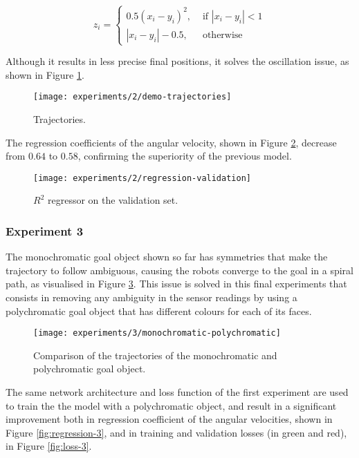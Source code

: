 \begin{equation}
z_i = 
\begin{cases}
0.5 (x_i-y_i)^2, &\text{ if } |x_i-y_i|<1 \\
|x_i-y_i| - 0.5, &\text{ otherwise}
\end{cases}
\end{equation}

 
Although it results in less precise final positions, it solves the oscillation 
issue, as shown in Figure \ref{fig:demo-trajectories}.

\begin{figure}[htbp]
	\centerline{\texttt{[image: experiments/2/demo-trajectories]}}
	\caption{Trajectories.}
	\label{fig:demo-trajectories}
\end{figure}

The regression coefficients of the angular velocity, shown in Figure 
\ref{fig:regression-validation}, decrease from $0.64$ to $0.58$, confirming the 
superiority of the previous model.

\begin{figure}[htbp]
	\centerline{\texttt{[image: experiments/2/regression-validation]}}
	\caption{$R^2$ regressor on the validation set.}
	\label{fig:regression-validation}
\end{figure}

\subsubsection{Experiment 3}

The monochromatic goal object shown so far has symmetries that make the 
trajectory to follow ambiguous, causing the robots converge to the goal in a 
spiral path, as visualised in Figure \ref{fig:demo-circle-trajectories}.
This issue is solved in this final experiments that consists in removing any 
ambiguity in the sensor readings by using a polychromatic goal object that has 
different colours for each of its faces.

\begin{figure}[htbp]
	\centerline{\texttt{[image: experiments/3/monochromatic-polychromatic]}}
	\caption{Comparison of the trajectories of the monochromatic and 
	polychromatic goal object.}
	\label{fig:demo-circle-trajectories}
\end{figure}

The same network architecture and loss function of the first experiment are 
used to train the the model with a polychromatic object, and result in a 
significant improvement both in regression coefficient of the angular 
velocities, shown in Figure \ref{fig:regression-3}, and in training and 
validation losses (in green and red), in Figure \ref{fig:loss-3}.

